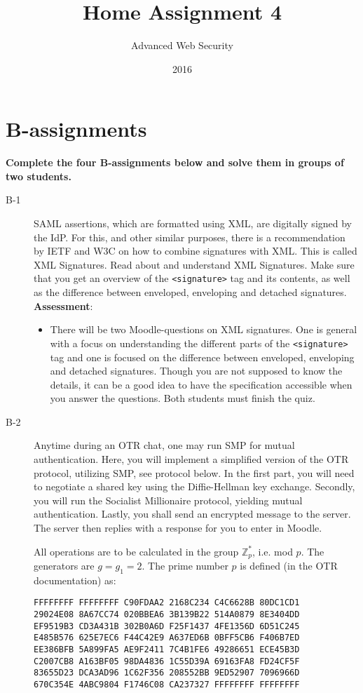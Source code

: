 \documentclass{article}
\begin{document}
\title{Home Assignment 4}
\author{Advanced Web Security}
\date{2016}

\maketitle

\section*{B-assignments}
\textbf{Complete the four B-assignments below and solve them in groups of two students.}

\begin{description}

	\item[B-1]{SAML assertions, which are formatted using XML, are digitally signed by the IdP. For this, and other similar purposes, there is a recommendation by IETF and W3C on how to combine signatures with XML. This is called XML Signatures. Read about and understand XML Signatures. Make sure that you get an overview of the \texttt{<signature>} tag and its contents, as well as the difference between enveloped, enveloping and detached signatures.\\
    \textbf{Assessment}:
	\begin{itemize}
		\item There will be two Moodle-questions on XML signatures. One is general with a focus on understanding the different parts of the \texttt{<signature>} tag and one is focused on the difference between enveloped, enveloping and detached signatures. Though you are not supposed to know the details, it can be a good idea to have the specification accessible when you answer the questions. Both students must finish the quiz.
	\end{itemize}}

	\item[B-2]{Anytime during an OTR chat, one may run SMP for mutual authentication. Here, you will implement
    a simplified version of the OTR protocol, utilizing SMP, see protocol below. In the first part,
    you will need to negotiate a shared key using the Diffie-Hellman key exchange.
    Secondly, you will run the Socialist Millionaire protocol, yielding mutual authentication.
    Lastly, you shall send an encrypted message to the server. The server then replies with a response for you to enter in Moodle.
    
    All operations are to be calculated in the group $\mathbb{Z}_p^*$, i.e. mod $p$. The generators are $g = g_1 = 2$.
    The prime number $p$ is defined (in the OTR documentation) as:
    \begin{verbatim}
FFFFFFFF FFFFFFFF C90FDAA2 2168C234 C4C6628B 80DC1CD1
29024E08 8A67CC74 020BBEA6 3B139B22 514A0879 8E3404DD
EF9519B3 CD3A431B 302B0A6D F25F1437 4FE1356D 6D51C245
E485B576 625E7EC6 F44C42E9 A637ED6B 0BFF5CB6 F406B7ED
EE386BFB 5A899FA5 AE9F2411 7C4B1FE6 49286651 ECE45B3D
C2007CB8 A163BF05 98DA4836 1C55D39A 69163FA8 FD24CF5F
83655D23 DCA3AD96 1C62F356 208552BB 9ED52907 7096966D
670C354E 4ABC9804 F1746C08 CA237327 FFFFFFFF FFFFFFFF
    \end{verbatim}
    
}
\end{description}
\end{document}
